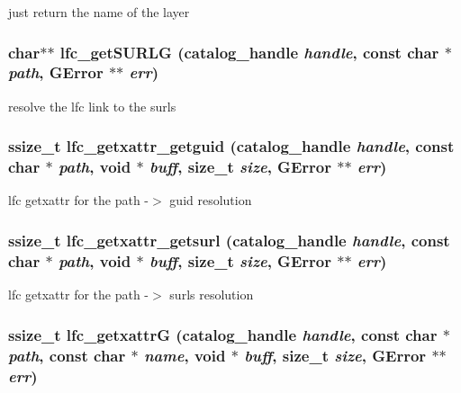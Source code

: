 just return the name of the layer 
\subsubsection{\setlength{\rightskip}{0pt plus 5cm}char$\ast$$\ast$ lfc\_\-get\-SURLG (catalog\_\-handle {\em handle}, const char $\ast$ {\em path}, GError $\ast$$\ast$ {\em err})}\label{gfal__common__lfc_8c_7c1d8699d8ad924234db163860dadf40}


resolve the lfc link to the surls 
\subsubsection{\setlength{\rightskip}{0pt plus 5cm}ssize\_\-t lfc\_\-getxattr\_\-getguid (catalog\_\-handle {\em handle}, const char $\ast$ {\em path}, void $\ast$ {\em buff}, size\_\-t {\em size}, GError $\ast$$\ast$ {\em err})}\label{gfal__common__lfc_8c_91ab62f141c50564971c1be3a16b0e97}


lfc getxattr for the path -$>$ guid resolution 
\subsubsection{\setlength{\rightskip}{0pt plus 5cm}ssize\_\-t lfc\_\-getxattr\_\-getsurl (catalog\_\-handle {\em handle}, const char $\ast$ {\em path}, void $\ast$ {\em buff}, size\_\-t {\em size}, GError $\ast$$\ast$ {\em err})}\label{gfal__common__lfc_8c_3b14a6913fa0483a07076140d46bbf99}


lfc getxattr for the path -$>$ surls resolution 
\subsubsection{\setlength{\rightskip}{0pt plus 5cm}ssize\_\-t lfc\_\-getxattr\-G (catalog\_\-handle {\em handle}, const char $\ast$ {\em path}, const char $\ast$ {\em name}, void $\ast$ {\em buff}, size\_\-t {\em size}, GError $\ast$$\ast$ {\em err})}\label{gfal__common__lfc_8c_b4cd844c617093e2a9d612583fb334f7}


